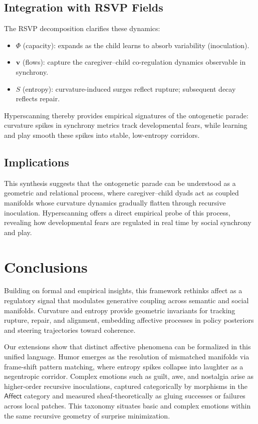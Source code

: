 \documentclass{article}
\theoremstyle{definition}
\begin{document}
\subsection{Integration with RSVP Fields}

The RSVP decomposition clarifies these dynamics:

\begin{itemize}
  \item $\Phi$ (capacity): expands as the child learns to absorb 
        variability (inoculation).
  \item $\mathbf{v}$ (flows): capture the caregiver–child co-regulation 
        dynamics observable in synchrony.
  \item $S$ (entropy): curvature-induced surges reflect rupture; 
        subsequent decay reflects repair.
\end{itemize}

Hyperscanning thereby provides empirical signatures of the ontogenetic parade: 
curvature spikes in synchrony metrics track developmental fears, while 
learning and play smooth these spikes into stable, low-entropy corridors.

\subsection{Implications}

This synthesis suggests that the ontogenetic parade can be understood as a 
geometric and relational process, where caregiver–child dyads act as coupled 
manifolds whose curvature dynamics gradually flatten through recursive 
inoculation. Hyperscanning offers a direct empirical probe of this process, 
revealing how developmental fears are regulated in real time by social 
synchrony and play.
\section{Conclusions}

Building on formal and empirical insights, this framework rethinks affect as 
a regulatory signal that modulates generative coupling across semantic and 
social manifolds. Curvature and entropy provide geometric invariants for 
tracking rupture, repair, and alignment, embedding affective processes in 
policy posteriors \cite{dacosta2020planning} and steering trajectories 
toward coherence.

Our extensions show that distinct affective phenomena can be formalized in 
this unified language. Humor emerges as the resolution of mismatched manifolds 
via frame-shift pattern matching, where entropy spikes collapse into laughter 
as a negentropic corridor. Complex emotions such as guilt, awe, and nostalgia 
arise as higher-order recursive inoculations, captured categorically by 
morphisms in the $\mathsf{Affect}$ category and measured sheaf-theoretically 
as gluing successes or failures across local patches. This taxonomy situates 
basic and complex emotions within the same recursive geometry of surprise 
minimization.
\end{document}
